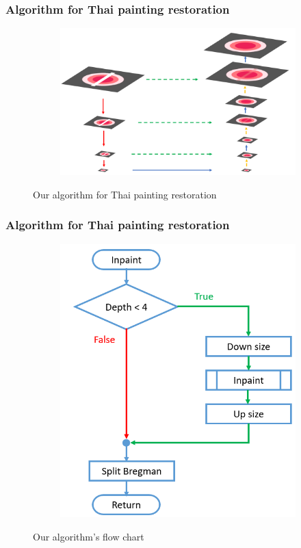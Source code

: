 \documentclass[xcolor=dvipsnames, xetex,serif]{beamer}
\begin{document}
    \begin{frame}
		\frametitle{Algorithm for Thai painting restoration}
		\begin{figure}[H]
			\centering
			\begin{subfigure}{0.7\linewidth}
				\centering
				\includegraphics[width=1\linewidth]{images/method_thaiart/step_thaiart.png}
			\end{subfigure}
			\caption{Our algorithm for Thai painting restoration}
        \end{figure}
	\end{frame}
	\begin{frame}
		\frametitle{Algorithm for Thai painting restoration}
		\begin{figure}[H]
			\centering
			\begin{subfigure}{0.5\linewidth}
				\centering
				\includegraphics[width=1\linewidth]{images/method_thaiart/flowchart_thaiart.png}
			\end{subfigure}
			\caption{Our algorithm's flow chart}
		\end{figure}
	\end{frame}
\end{document}
